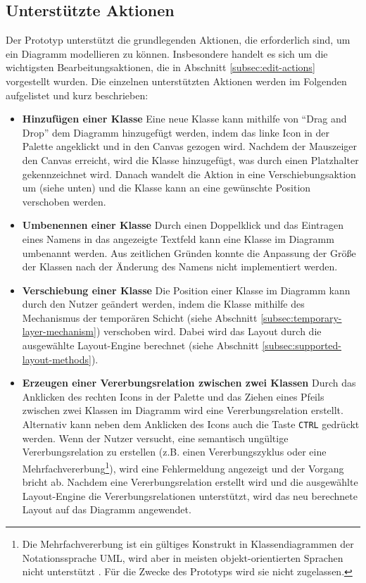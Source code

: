 \subsection{Unterstützte Aktionen}
\label{subsec:supported-actions}

Der Prototyp unterstützt die grundlegenden Aktionen, die erforderlich sind, um ein Diagramm modellieren zu können. Insbesondere handelt es sich um die wichtigsten Bearbeitungsaktionen, die in Abschnitt \ref{subsec:edit-actions} vorgestellt wurden. Die einzelnen unterstützten Aktionen werden im Folgenden aufgelistet und kurz beschrieben:

\begin{itemize}

\item
\textbf{Hinzufügen einer Klasse}
Eine neue Klasse kann mithilfe von \enquote{Drag and Drop} dem Diagramm hinzugefügt werden, indem das linke Icon in der Palette angeklickt und in den Canvas gezogen wird. Nachdem der Mauszeiger den Canvas erreicht, wird die Klasse hinzugefügt, was durch einen Platzhalter gekennzeichnet wird. Danach wandelt die Aktion in eine Verschiebungsaktion um (siehe unten) und die Klasse kann an eine gewünschte Position verschoben werden.

\item
\textbf{Umbenennen einer Klasse}
Durch einen Doppelklick und das Eintragen eines Namens in das angezeigte Textfeld kann eine Klasse im Diagramm umbenannt werden. Aus zeitlichen Gründen konnte die Anpassung der Größe der Klassen nach der Änderung des Namens nicht implementiert werden.

\item
\textbf{Verschiebung einer Klasse}
Die Position einer Klasse im Diagramm kann durch den Nutzer geändert werden, indem die Klasse mithilfe des Mechanismus der temporären Schicht (siehe Abschnitt \ref{subsec:temporary-layer-mechanism}) verschoben wird. Dabei wird das Layout durch die ausgewählte Layout-Engine berechnet (siehe Abschnitt \ref{subsec:supported-layout-methods}).

\item
\textbf{Erzeugen einer Vererbungsrelation zwischen zwei Klassen}
Durch das Anklicken des rechten Icons in der Palette und das Ziehen eines Pfeils zwischen zwei Klassen im Diagramm wird eine Vererbungsrelation erstellt. Alternativ kann neben dem Anklicken des Icons auch die Taste \texttt{CTRL} gedrückt werden. Wenn der Nutzer versucht, eine semantisch ungültige Vererbungsrelation zu erstellen (z.B. einen Vererbungszyklus oder eine Mehrfachvererbung\footnote{Die Mehrfachvererbung ist ein gültiges Konstrukt in Klassendiagrammen der Notationssprache UML, wird aber in meisten objekt-orientierten Sprachen nicht unterstützt \cite{ArlowNeustadt05UML-2-and-the-Unified}. Für die Zwecke des Prototyps wird sie nicht zugelassen.}), wird eine Fehlermeldung angezeigt und der Vorgang bricht ab. Nachdem eine Vererbungsrelation erstellt wird und die ausgewählte Layout-Engine die Vererbungsrelationen unterstützt, wird das neu berechnete Layout auf das Diagramm angewendet.


\end{itemize}
